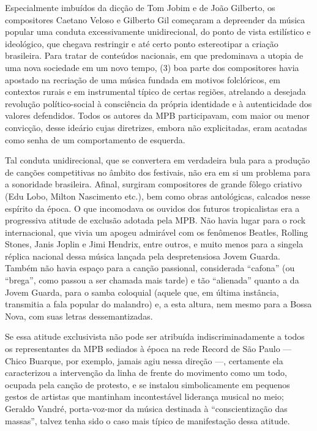 Especialmente imbuídos da dicção de Tom Jobim e de João Gilberto, os
compositores Caetano Veloso e Gilberto Gil começaram a depreender da
música popular uma conduta excessivamente unidirecional, do ponto de
vista estilístico e ideológico, que chegava restringir e até certo ponto
estereotipar a criação brasileira. Para tratar de conteúdos nacionais,
em que predominava a utopia de uma nova sociedade em um novo tempo, (3)
boa parte dos compositores havia apostado na recriação de uma música
fundada em motivos folclóricos, em contextos rurais e em instrumental
típico de certas regiões, atrelando a desejada revolução político-social
à consciência da própria identidade e à autenticidade dos valores
defendidos. Todos os autores da MPB participavam, com maior ou menor
convicção, desse ideário cujas diretrizes, embora não explicitadas, eram
acatadas como senha de um comportamento de esquerda.

Tal conduta unidirecional, que se convertera em verdadeira bula para a
produção de canções competitivas no âmbito dos festivais, não era em si
um problema para a sonoridade brasileira. Afinal, surgiram compositores
de grande fôlego criativo (Edu Lobo, Milton Nascimento etc.), bem como
obras antológicas, calcados nesse espírito da época. O que incomodava os
ouvidos dos futuros tropicalistas era a progressiva atitude de exclusão
adotada pela MPB. Não havia lugar para o rock internacional, que vivia
um apogeu admirável com os fenômenos Beatles, Rolling Stones, Janis
Joplin e Jimi Hendrix, entre outros, e muito menos para a singela
réplica nacional dessa música lançada pela despretensiosa Jovem Guarda.
Também não havia espaço para a canção passional, considerada ``cafona''
(ou ``brega'', como passou a ser chamada mais tarde) e tão ``alienada''
quanto a da Jovem Guarda, para o samba coloquial (aquele que, em última
instância, transmitia a fala popular do malandro) e, a esta altura, nem
mesmo para a Bossa Nova, com suas letras dessemantizadas.

Se essa atitude exclusivista não pode ser atribuída indiscriminadamente
a todos os representantes da MPB sediados à época na rede Record de São
Paulo --- Chico Buarque, por exemplo, jamais agiu nessa direção ---,
certamente ela caracterizou a intervenção da linha de frente do
movimento como um todo, ocupada pela canção de protesto, e se instalou
simbolicamente em pequenos gestos de artistas que mantinham
incontestável liderança musical no meio; Geraldo Vandré, porta-voz-mor
da música destinada à ``conscientização das massas'', talvez tenha sido
o caso mais típico de manifestação dessa atitude.

